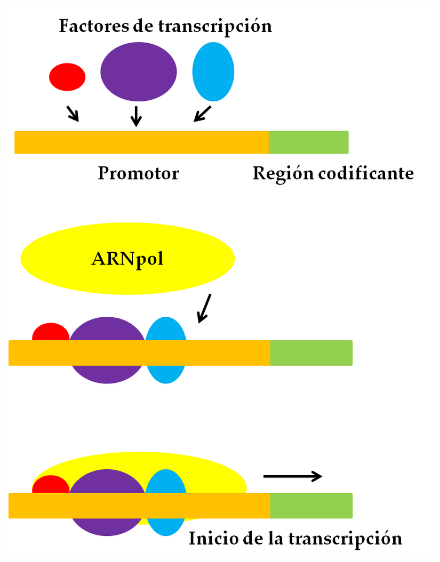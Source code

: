 \documentclass[xcolor=dvipsnames]{beamer}
\begin{document}
\begin{frame}
\begin{columns}[c]
\begin{figure}[p]
    \centering
    \includegraphics[width=.9\textwidth]{con-tf_simple}
\end{figure}
\end{columns}
\end{frame}
\end{document}
